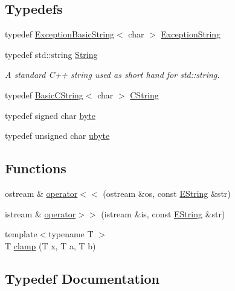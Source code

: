 \subsection*{Typedefs}
\begin{DoxyCompactItemize}
\item 
typedef \hyperlink{class_triton_1_1_util_1_1_exception_basic_string}{Exception\+Basic\+String}$<$ char $>$ \hyperlink{namespace_triton_1_1_util_a7e55ae91d6ccf98a52870cf7b7648eb7}{Exception\+String}
\item 
typedef std\+::string \hyperlink{namespace_triton_1_1_util_ab36ffddebe19fdd103ec60af3841d9e2}{String}
\begin{DoxyCompactList}\small\item\em A standard C++ string used as short hand for std\+::string. \end{DoxyCompactList}\item 
typedef \hyperlink{class_triton_1_1_util_1_1_basic_c_string}{Basic\+C\+String}$<$ char $>$ \hyperlink{namespace_triton_1_1_util_aae040a6f7915195279abca47c7d72175}{C\+String}
\item 
typedef signed char \hyperlink{namespace_triton_1_1_util_ad57cf95b37eb5579968c3bef61027c29}{byte}
\item 
typedef unsigned char \hyperlink{namespace_triton_1_1_util_ab500b1da84b836a7047d064876e96983}{ubyte}
\end{DoxyCompactItemize}
\subsection*{Functions}
\begin{DoxyCompactItemize}
\item 
ostream \& \hyperlink{namespace_triton_1_1_util_ae22c026f618a81b0622952e33095e85e}{operator$<$$<$} (ostream \&os, const \hyperlink{class_triton_1_1_util_1_1_e_string}{E\+String} \&str)
\item 
istream \& \hyperlink{namespace_triton_1_1_util_a4f29ffa7758eed221418c5bfb400a85f}{operator$>$$>$} (istream \&is, const \hyperlink{class_triton_1_1_util_1_1_e_string}{E\+String} \&str)
\item 
{\footnotesize template$<$typename T $>$ }\\T \hyperlink{namespace_triton_1_1_util_a4d06d73b9bd63df4d07bb27f19328f76}{clamp} (T x, T a, T b)
\end{DoxyCompactItemize}


\subsection{Typedef Documentation}
\hypertarget{namespace_triton_1_1_util_ad57cf95b37eb5579968c3bef61027c29}{}
